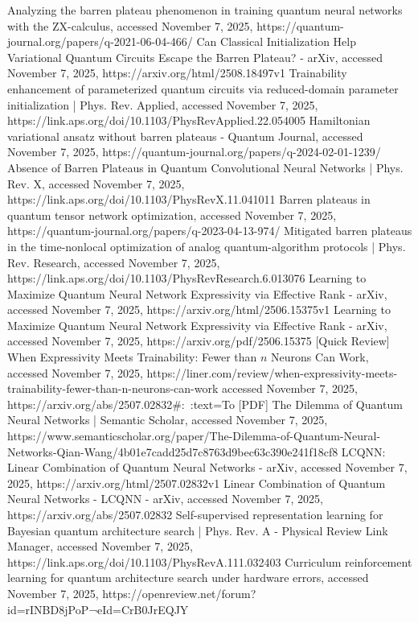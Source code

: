 \documentclass[12pt,a4paper]{article}
\begin{document}
Analyzing the barren plateau phenomenon in training quantum neural networks with the ZX-calculus, accessed November 7, 2025, https://quantum-journal.org/papers/q-2021-06-04-466/
Can Classical Initialization Help Variational Quantum Circuits Escape the Barren Plateau? - arXiv, accessed November 7, 2025, https://arxiv.org/html/2508.18497v1
Trainability enhancement of parameterized quantum circuits via reduced-domain parameter initialization | Phys. Rev. Applied, accessed November 7, 2025, https://link.aps.org/doi/10.1103/PhysRevApplied.22.054005
Hamiltonian variational ansatz without barren plateaus - Quantum Journal, accessed November 7, 2025, https://quantum-journal.org/papers/q-2024-02-01-1239/
Absence of Barren Plateaus in Quantum Convolutional Neural Networks | Phys. Rev. X, accessed November 7, 2025, https://link.aps.org/doi/10.1103/PhysRevX.11.041011
Barren plateaus in quantum tensor network optimization, accessed November 7, 2025, https://quantum-journal.org/papers/q-2023-04-13-974/
Mitigated barren plateaus in the time-nonlocal optimization of analog quantum-algorithm protocols | Phys. Rev. Research, accessed November 7, 2025, https://link.aps.org/doi/10.1103/PhysRevResearch.6.013076
Learning to Maximize Quantum Neural Network Expressivity via Effective Rank - arXiv, accessed November 7, 2025, https://arxiv.org/html/2506.15375v1
Learning to Maximize Quantum Neural Network Expressivity via Effective Rank - arXiv, accessed November 7, 2025, https://arxiv.org/pdf/2506.15375
[Quick Review] When Expressivity Meets Trainability: Fewer than $n$ Neurons Can Work, accessed November 7, 2025, https://liner.com/review/when-expressivity-meets-trainability-fewer-than-n-neurons-can-work
accessed November 7, 2025, https://arxiv.org/abs/2507.02832#:~:text=To%
[PDF] The Dilemma of Quantum Neural Networks | Semantic Scholar, accessed November 7, 2025, https://www.semanticscholar.org/paper/The-Dilemma-of-Quantum-Neural-Networks-Qian-Wang/4b01e7cadd25d7c8763d9bec63c390e241f18cf8
LCQNN: Linear Combination of Quantum Neural Networks - arXiv, accessed November 7, 2025, https://arxiv.org/html/2507.02832v1
Linear Combination of Quantum Neural Networks - LCQNN - arXiv, accessed November 7, 2025, https://arxiv.org/abs/2507.02832
Self-supervised representation learning for Bayesian quantum architecture search | Phys. Rev. A - Physical Review Link Manager, accessed November 7, 2025, https://link.aps.org/doi/10.1103/PhysRevA.111.032403
Curriculum reinforcement learning for quantum architecture search under hardware errors, accessed November 7, 2025, https://openreview.net/forum?id=rINBD8jPoP¬eId=CrB0JrEQJY
\end{document}
